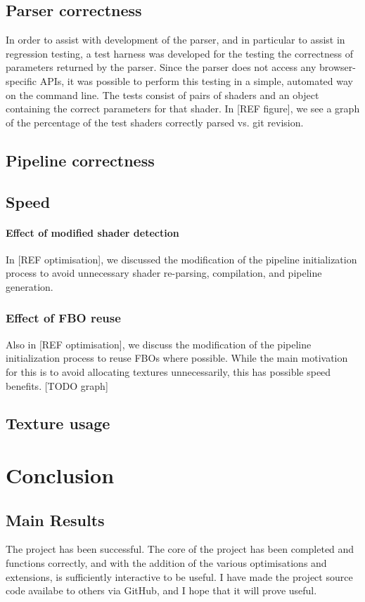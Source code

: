 \documentclass[12pt,twoside,notitlepage]{report}
\begin{document}
\section{Parser correctness}
In order to assist with development of the parser, and in particular to assist in regression testing, a test harness was developed for the testing the correctness of parameters returned by the parser. Since the parser does not access any browser-specific APIs, it was possible to perform this testing in a simple, automated way on the command line. The tests consist of pairs of shaders and an object containing the correct parameters for that shader. In [REF figure], we see a graph of the percentage of the test shaders correctly parsed vs. git revision.


\section{Pipeline correctness}

\section{Speed}
\subsubsection{Effect of modified shader detection}
In [REF optimisation], we discussed the modification of the pipeline initialization process to avoid unnecessary shader re-parsing, compilation, and pipeline generation. 

\subsection{Effect of FBO reuse}
Also in [REF optimisation], we discuss the modification of the pipeline initialization process to reuse FBOs where possible. While the main motivation for this is to avoid allocating textures unnecessarily, this has possible speed benefits. [TODO graph]

\section{Texture usage}

\cleardoublepage
\chapter{Conclusion}

\section{Main Results}
The project has been successful. The core of the project has been completed and functions correctly, and with the addition of the various optimisations and extensions, is sufficiently interactive to be useful. I have made the project source code availabe to others via GitHub, and I hope that it will prove useful.
\end{document}
